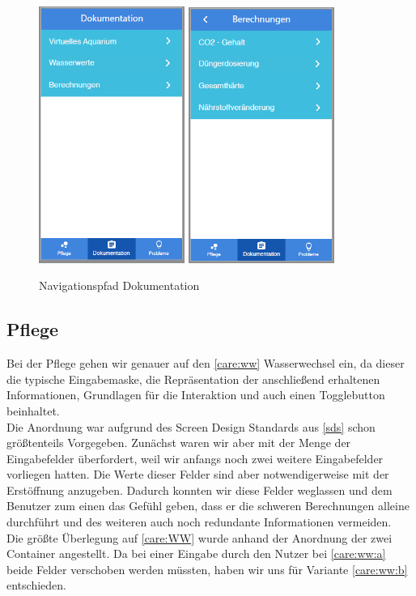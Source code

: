\begin{figure}
	\centering
	\includegraphics[width=180px,height=\textheight,
keepaspectratio]{nav_doku}
	\includegraphics[width=180px,height=\textheight,
keepaspectratio]{nav_doku_Berechnungen}
	\caption{Navigationspfad Dokumentation}
	\label{nav:doku}
\end{figure}



\subsection{Pflege}
Bei der Pflege gehen wir genauer auf den \ref{care:ww} Wasserwechsel ein, da dieser die typische Eingabemaske, die Repräsentation der anschließend erhaltenen Informationen, Grundlagen für die Interaktion und auch einen Togglebutton beinhaltet. 
\\
Die Anordnung war aufgrund des Screen Design Standards aus \ref{sds} schon größtenteils Vorgegeben. Zunächst waren wir aber mit der Menge der Eingabefelder überfordert, weil wir anfangs noch zwei weitere Eingabefelder vorliegen hatten. Die Werte dieser Felder sind aber notwendigerweise mit der Erstöffnung anzugeben. Dadurch konnten wir diese Felder weglassen und dem Benutzer zum einen das Gefühl geben, dass er die schweren Berechnungen alleine durchführt und des weiteren auch noch redundante Informationen vermeiden. \\
Die größte Überlegung auf \ref{care:WW} wurde anhand der Anordnung der zwei Container angestellt. Da bei einer Eingabe durch den Nutzer bei \ref{care:ww:a} beide Felder verschoben werden müssten, haben wir uns für Variante \ref{care:ww:b} entschieden. 

